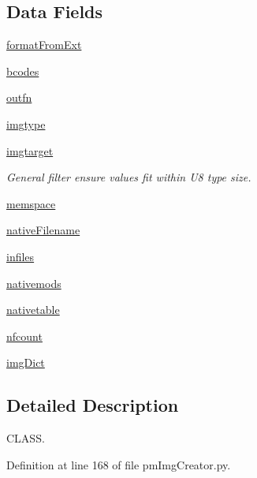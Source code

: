 \subsection*{Data Fields}
\begin{DoxyCompactItemize}
\item 
\hyperlink{classpm_img_creator_1_1_pm_img_creator_a82fce01e7ade132aebf4cfdc273ddec0}{format\-From\-Ext}
\item 
\hyperlink{classpm_img_creator_1_1_pm_img_creator_a2024e87cbf388b462a13c9734ee76927}{bcodes}
\item 
\hyperlink{classpm_img_creator_1_1_pm_img_creator_a75df28e03f77f979b3ff008a9c0c2d50}{outfn}
\item 
\hyperlink{classpm_img_creator_1_1_pm_img_creator_af82fbdbae4c8da3e2a1bb2cccd172926}{imgtype}
\item 
\hyperlink{classpm_img_creator_1_1_pm_img_creator_a2972be9fecc5ce9a934e2f87a611ab53}{imgtarget}
\begin{DoxyCompactList}\small\item\em General filter ensure values fit within U8 type size. \end{DoxyCompactList}\item 
\hyperlink{classpm_img_creator_1_1_pm_img_creator_acdee41691c3c76847f809882a239d82a}{memspace}
\item 
\hyperlink{classpm_img_creator_1_1_pm_img_creator_aa0a245fe0a2e8ac1ebb6b4a2c60275c4}{native\-Filename}
\item 
\hyperlink{classpm_img_creator_1_1_pm_img_creator_a827499b441df4df8ea1d60f8ae1e4827}{infiles}
\item 
\hyperlink{classpm_img_creator_1_1_pm_img_creator_ab29bcbbed701b9014bda0c02c67efa76}{nativemods}
\item 
\hyperlink{classpm_img_creator_1_1_pm_img_creator_adf0b3f59a9f22c08a0987c84a560b892}{nativetable}
\item 
\hyperlink{classpm_img_creator_1_1_pm_img_creator_ab69f298a6d8c75d5ea54bfab9cf02f83}{nfcount}
\item 
\hyperlink{classpm_img_creator_1_1_pm_img_creator_a4f00474bb6c13f0b49a6c0b977b59858}{img\-Dict}
\end{DoxyCompactItemize}


\subsection{Detailed Description}
C\-L\-A\-S\-S. 

Definition at line 168 of file pm\-Img\-Creator.\-py.



